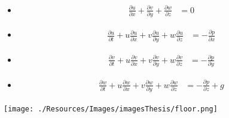 
\begin{frame}

\begin{minipage}{0.35\textwidth}
\begin{itemize}
\item<1->[]
\begin{align*}
\frac{\partial u}{\partial x} + \frac{\partial v}{\partial y} + \frac{\partial w}{\partial z} &= 0
\end{align*}
\item<1->[]
\begin{align*}
\frac{\partial u}{\partial t} + u\frac{\partial u}{\partial x} + v\frac{\partial u}{\partial y} + w\frac{\partial u}{\partial z} &= - \frac{\partial p}{\partial x}
\end{align*}
\item<1->[]
\begin{align*}
\frac{\partial v}{\partial t} + u\frac{\partial v}{\partial x} + v\frac{\partial v}{\partial y} + w\frac{\partial v}{\partial z}&= - \frac{\partial p}{\partial y}
\end{align*}
\item<1->[]
\begin{align*}
\frac{\partial w}{\partial t} + u\frac{\partial w}{\partial x} + v\frac{\partial w}{\partial y} + w\frac{\partial w}{\partial z} &= - \frac{\partial p}{\partial z} + g \end{align*}
\end{itemize}
\end{minipage}
\hspace{1.5cm}
\begin{minipage}{0.35\textwidth}
\texttt{[image: ./Resources/Images/imagesThesis/floor.png]}%
\end{minipage}
\end{frame}
\clearpage


